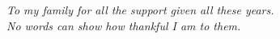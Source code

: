 
\chapter*{}

\begin{flushright}
  \textit{
    To my family for all the support given all these years.\\
    No words can show how thankful I am to them.
  }
\end{flushright}
